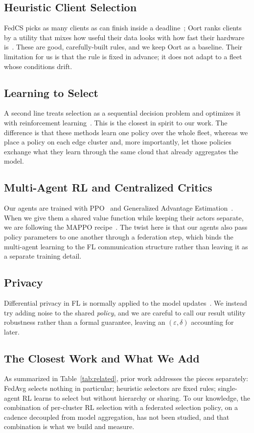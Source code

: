 \documentclass[conference]{IEEEtran}
\begin{document}
\subsection{Heuristic Client Selection}
FedCS picks as many clients as can finish inside a deadline~\cite{nishio2019};
Oort ranks clients by a utility that mixes how useful their data looks with how
fast their hardware is~\cite{lai2021}. These are good, carefully-built rules, and
we keep Oort as a baseline. Their limitation for us is that the rule is fixed in
advance; it does not adapt to a fleet whose conditions drift.

\subsection{Learning to Select}
A second line treats selection as a sequential decision problem and optimizes it
with reinforcement learning~\cite{wang2020}. This is the closest in spirit to our
work. The difference is that these methods learn one policy over the whole fleet,
whereas we place a policy on each edge cluster and, more importantly, let those
policies exchange what they learn through the same cloud that already aggregates
the model.

\subsection{Multi-Agent RL and Centralized Critics}
Our agents are trained with PPO~\cite{schulman2017} and Generalized Advantage
Estimation~\cite{gae2016}. When we give them a shared value function while keeping
their actors separate, we are following the MAPPO recipe~\cite{yu2022}. The twist
here is that our agents also pass policy parameters to one another through a
federation step, which binds the multi-agent learning to the FL communication
structure rather than leaving it as a separate training detail.

\subsection{Privacy}
Differential privacy in FL is normally applied to the model
updates~\cite{abadi2016}. We instead try adding noise to the shared \emph{policy},
and we are careful to call our result utility robustness rather than a formal
guarantee, leaving an $(\varepsilon,\delta)$ accounting for later.

\subsection{The Closest Work and What We Add}
As summarized in Table~\ref{tab:related}, prior work addresses the pieces
separately: FedAvg selects nothing in particular; heuristic selectors are fixed
rules; single-agent RL learns to select but without hierarchy or sharing. To our
knowledge, the combination of per-cluster RL selection with a federated selection
policy, on a cadence decoupled from model aggregation, has not been studied, and
that combination is what we build and measure.
\end{document}
